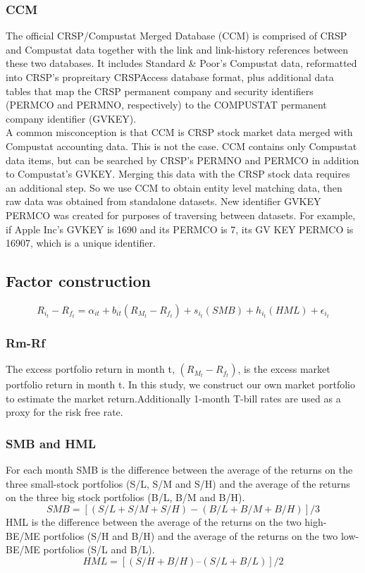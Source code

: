 \documentclass[12pt]{article}
\begin{document}
\subsubsection{CCM}
\noindent The official CRSP/Compustat Merged Database (CCM) is comprised of CRSP and Compustat data together with the link and link-history references between these two databases. It includes Standard \& Poor's Compustat data, reformatted into CRSP's propreitary CRSPAccess database format, plus additional data tables that map the CRSP permanent company and security identifiers (PERMCO and PERMNO, respectively) to the COMPUSTAT permanent company identifier (GVKEY).\\

\noindent A common misconception is that CCM is CRSP stock market data merged with Compustat accounting data. This is not the case. CCM contains only Compustat data items, but can be searched by CRSP's PERMNO and PERMCO in addition to Compustat's GVKEY. Merging this data with the CRSP stock data requires an additional step. So we use CCM to obtain entity level matching data, then raw data was obtained from standalone datasets. New identifier GVKEY PERMCO was created for purposes of traversing between datasets.
For example, if Apple Inc’s GVKEY is 1690 and its PERMCO is 7, its GV KEY PERMCO is 16907, which is a unique identifier.

\subsection{Factor construction}
$$
R_{i_t}-R_{f_t}=\alpha_{it}+b_{it}(R_{M_t}-R_{f_t})+s_{i_t}(SMB)+h_{i_t}(HML)+\epsilon_{i_t}
$$
\subsubsection{Rm-Rf}
The excess portfolio return in month t, $(R_{M_t}-R_{f_t})$, is the excess market portfolio return in month t. In this study, we construct our own market portfolio to estimate the market return.Additionally 1-month T-bill rates are used as a proxy for the risk free rate.
\subsubsection{SMB and HML}
\noindent For each month SMB is the difference between the average of the returns on the three small-stock portfolios (S/L, S/M and S/H) and the average of the returns on the three big stock portfolios (B/L, B/M and B/H).
$$
SMB=[(S/L+S/M+S/H)-(B/L+B/M+B/H)]/3
$$
HML is the difference between the average of the returns on the two high-BE/ME portfolios (S/H and B/H) and the average of the returns on the two low-BE/ME portfolios (S/L and B/L).
$$
HML = [(S/H+B/H)–(S/L+B/L)]/2
$$
\end{document}
